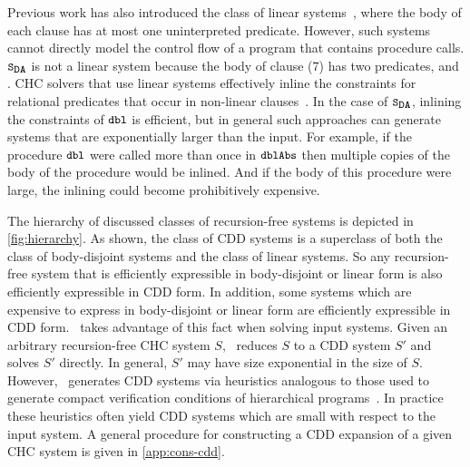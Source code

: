 Previous work has also introduced the class of linear
systems~\cite{albarghouthi12a}, where the body of each clause has at
most one uninterpreted predicate.
%
However, such systems cannot directly model the control flow of a
program that contains procedure calls.
%
$\mcchc$ is not a linear system because the body of clause (7) has two
predicates,  and .
%
CHC solvers that use linear systems effectively inline the
constraints for relational predicates that occur in non-linear
clauses~\cite{albarghouthi12b}.
%
In the case of $\mcchc$, inlining the constraints of $\cc{dbl}$ is
efficient, but in general such approaches can generate systems that
are exponentially larger than the input. For example, if the procedure
$\cc{dbl}$ were called more than once in $\cc{dblAbs}$ then multiple
copies of the body of the procedure would be inlined. And if the body
of this procedure were large, the inlining could become
prohibitively expensive.

\begin{figure}[t]
  \centering
  \begin{floatrow}[2]
      {}
      {}
  \end{floatrow}
\end{figure}

The hierarchy of discussed classes of recursion-free systems is
depicted in \autoref{fig:hierarchy}.
%
As shown, the class of CDD systems is a superclass of both the class
of body-disjoint systems and the class of linear systems. So any
recursion-free system that is efficiently expressible in body-disjoint
or linear form is also efficiently expressible in CDD form.
%
In addition, some systems which are expensive to express in
body-disjoint or linear form are efficiently expressible in CDD form.
%
\sys~takes advantage of this fact when solving input systems.
Given an arbitrary recursion-free CHC system $S$, \sys~reduces $S$ to
a CDD system $S'$ and solves $S'$ directly.
%
In general, $S'$ may have size exponential in the size of
$S$.
%
However, \sys~generates CDD systems via heuristics analogous to
those used to generate compact verification conditions of hierarchical
programs~\cite{flanagan01,lal-qadeer15}.
%
In practice these heuristics often yield CDD systems which are
small with respect to the input system.
%
A general procedure for constructing a CDD expansion of a given CHC
system is given in \autoref{app:cons-cdd}.
